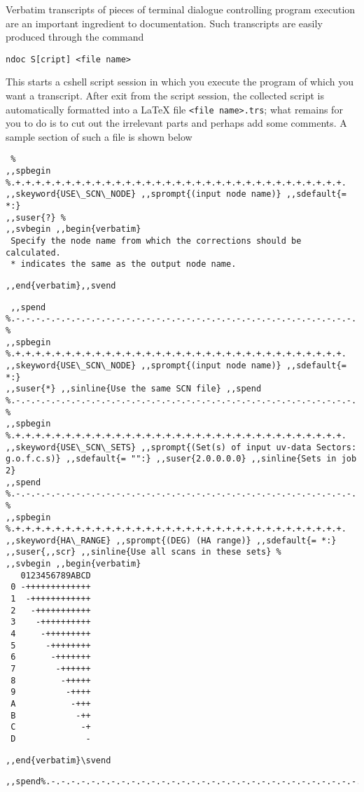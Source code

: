         Verbatim transcripts of pieces of terminal dialogue controlling program
execution are an important ingredient to documentation. Such transcripts are
easily produced through the command 

        \verb/ndoc S[cript] <file name>/ 

This starts a cshell script session in which you execute the program of which
you want a transcript. After exit from the script session, the collected script
is automatically formatted into a LaTeX file \verb/<file name>.trs/; what
remains for you to do is to cut out the irrelevant parts and perhaps add some
comments. A sample section of such a file is shown below 

\spbegin 
\svbegin \begin{verbatim} % 
,,spbegin %.+.+.+.+.+.+.+.+.+.+.+.+.+.+.+.+.+.+.+.+.+.+.+.+.+.+.+.+.+.+.+.+.+. 
,,skeyword{USE\_SCN\_NODE} ,,sprompt{(input node name)} ,,sdefault{= *:}
,,suser{?} % 
,,svbegin ,,begin{verbatim} 
 Specify the node name from which the corrections should be calculated. 
 * indicates the same as the output node name. 
\end{verbatim}\svend 
\verb/,,end{verbatim},,svend/ 
\svbegin\begin{verbatim} ,,spend
%.-.-.-.-.-.-.-.-.-.-.-.-.-.-.-.-.-.-.-.-.-.-.-.-.-.-.-.-.-.-.-.-.-.-. 
% 
,,spbegin %.+.+.+.+.+.+.+.+.+.+.+.+.+.+.+.+.+.+.+.+.+.+.+.+.+.+.+.+.+.+.+.+.+. 
,,skeyword{USE\_SCN\_NODE} ,,sprompt{(input node name)} ,,sdefault{= *:}
,,suser{*} ,,sinline{Use the same SCN file} ,,spend
%.-.-.-.-.-.-.-.-.-.-.-.-.-.-.-.-.-.-.-.-.-.-.-.-.-.-.-.-.-.-.-.-.-.-. 
% 
,,spbegin %.+.+.+.+.+.+.+.+.+.+.+.+.+.+.+.+.+.+.+.+.+.+.+.+.+.+.+.+.+.+.+.+.+. 
,,skeyword{USE\_SCN\_SETS} ,,sprompt{(Set(s) of input uv-data Sectors:
g.o.f.c.s)} ,,sdefault{= "":} ,,suser{2.0.0.0.0} ,,sinline{Sets in job 2}
,,spend %.-.-.-.-.-.-.-.-.-.-.-.-.-.-.-.-.-.-.-.-.-.-.-.-.-.-.-.-.-.-.-.-.-.-. 
% 
,,spbegin %.+.+.+.+.+.+.+.+.+.+.+.+.+.+.+.+.+.+.+.+.+.+.+.+.+.+.+.+.+.+.+.+.+. 
,,skeyword{HA\_RANGE} ,,sprompt{(DEG) (HA range)} ,,sdefault{= *:}
,,suser{,,scr} ,,sinline{Use all scans in these sets} % 
,,svbegin ,,begin{verbatim} 
   0123456789ABCD 
 0 -+++++++++++++ 
 1  -++++++++++++ 
 2   -+++++++++++ 
 3    -++++++++++ 
 4     -+++++++++ 
 5      -++++++++ 
 6       -+++++++ 
 7        -++++++ 
 8         -+++++ 
 9          -++++ 
 A           -+++ 
 B            -++ 
 C             -+ 
 D              - 
\end{verbatim}\svend 
\verb/,,end{verbatim}\svend/ 
\svbegin\begin{verbatim}
,,spend%.-.-.-.-.-.-.-.-.-.-.-.-.-.-.-.-.-.-.-.-.-.-.-.-.-.-.-.-.-.-.-.-./ 
\end{verbatim}\svend 
\spend 


